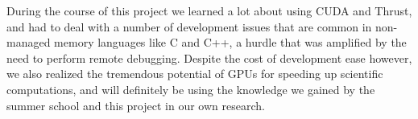 \documentclass[11pt,a4paper]{article}
\begin{document}
During the course of this project we learned a lot about using CUDA and Thrust, and had
to deal with a number of development issues that are common in non-managed memory 
languages like C and C++, a hurdle that was amplified by the need to perform remote
debugging. Despite the cost of development ease however, we also realized the tremendous potential of GPUs for speeding up scientific computations, and will definitely be
using the knowledge we gained by the summer school and this project in our own research.



\end{document}
